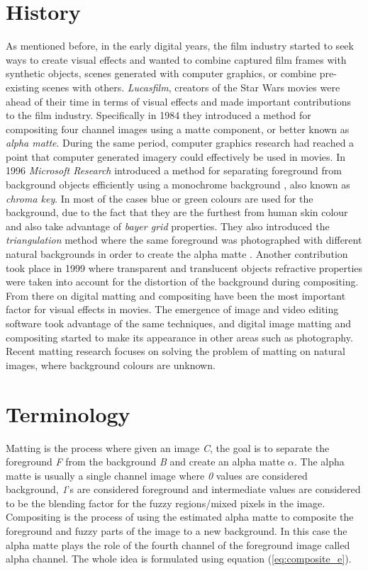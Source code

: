 \section{History}
\label{sec:history}

As mentioned before, in the early digital years, the film industry started to seek ways to create visual effects and wanted to combine captured film frames with synthetic objects, scenes generated with computer graphics, or combine pre-existing scenes with others. \textit{Lucasfilm}, creators of the Star Wars movies were ahead of their time in terms of visual effects and made important contributions to the film industry. Specifically in 1984 \cite{compositing} they introduced a method for compositing four channel images using a matte component, or better known as \textit{alpha matte}. During the same period, computer graphics research had reached a point that computer generated imagery could effectively be used in movies. In 1996 \textit{Microsoft Research} introduced a method for separating foreground from background objects efficiently using a monochrome background \cite{blue}, also known as \textit{chroma key}. In most of the cases blue or green colours are used for the background, due to the fact that they are the furthest from human skin colour and also take advantage of \textit{bayer grid} properties. They also introduced the \textit{triangulation} method where the same foreground was photographed with different natural backgrounds in order to create the alpha matte \cite{blue}. Another contribution took place in 1999 \cite{environment} where transparent and translucent objects refractive properties were taken into account for the distortion of the background during compositing. From there on digital matting and compositing have been the most important factor for visual effects in movies. The emergence of image and video editing software took advantage of the same techniques, and digital image matting and compositing started to make its appearance in other areas such as photography. Recent matting research focuses on solving the problem of matting on natural images, where background colours are unknown. 

\section{Terminology}
\label{sec:terminology}

Matting is the process where given an image \textit{C}, the goal is to separate the foreground \textit{F} from the background \textit{B} and create an alpha matte $\alpha$. The alpha matte is usually a single channel image where \textit{0} values are considered background, \textit{1}’s are considered foreground and intermediate values are considered to be the blending factor for the fuzzy regions/mixed pixels in the image. Compositing is the process of using the estimated alpha matte to composite the foreground and fuzzy parts of the image to a new background. In this case the alpha matte plays the role of the fourth channel of the foreground image called alpha channel. The whole idea is formulated using equation (\ref{eq:composite_e}). 

